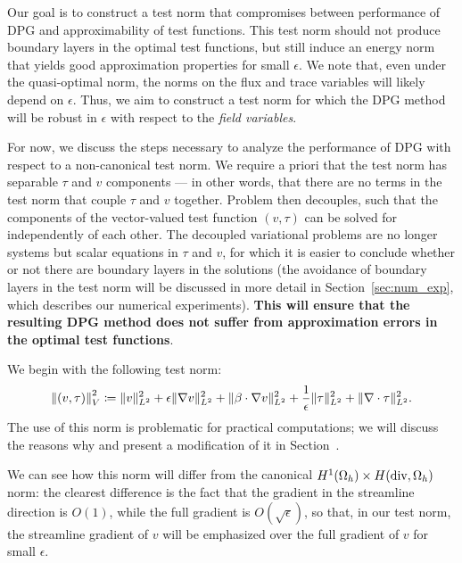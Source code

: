 Our goal is to construct a test norm that compromises between performance of DPG and approximability of test functions.  This test norm should not produce boundary layers in the optimal test functions, but still induce an energy norm that yields good approximation properties for small $\epsilon$. We note that, even under the quasi-optimal norm, the norms on the flux and trace variables will likely depend on $\epsilon$. Thus, we aim to construct a test norm for which the DPG method will be robust in $\epsilon$ with respect to the \emph{field variables}. 

For now, we discuss the steps necessary to analyze the performance of DPG with respect to a non-canonical test norm. We require a priori that the test norm has separable $\tau$ and $v$ components --- in other words, that there are no terms in the test norm that couple $\tau$ and $v$ together. Problem  then decouples, such that the components of the vector-valued test function $\left(v,\tau\right)$ can be solved for independently of each other. The decoupled variational problems are no longer systems but scalar equations in $\tau$ and $v$, for which it is easier to conclude whether or not there are boundary layers in the solutions (the avoidance of boundary layers in the test norm will be discussed in more detail in Section~\ref{sec:num_exp}, which describes our numerical experiments). \textbf{This will ensure that the resulting DPG method does not suffer from approximation errors in the optimal test functions}.

We begin with the following test norm:
\[
\left\|\left(v,\tau\right)\right\|^2_V \coloneqq \|v\|_{L^2}^2 + \epsilon\|\grad v\|_{L^2}^2 + \|\beta \cdot \grad v\|_{L^2}^2  + \frac{1}{\epsilon}\|\tau\|_{L^2}^2 + \|\div \tau\|_{L^2}^2.
\]
The use of this norm is problematic for practical computations; we will discuss the reasons why and present a modification of it in Section~. 

We can see how this norm will differ from the canonical $H^1(\Omega_h)\times H({\rm div},\Omega_h)$ norm: the clearest difference is the fact that the gradient in the streamline direction is $O(1)$, while the full gradient is $O(\sqrt{\epsilon})$, so that, in our test norm, the streamline gradient of $v$ will be emphasized over the full gradient of $v$ for small $\epsilon$. 

